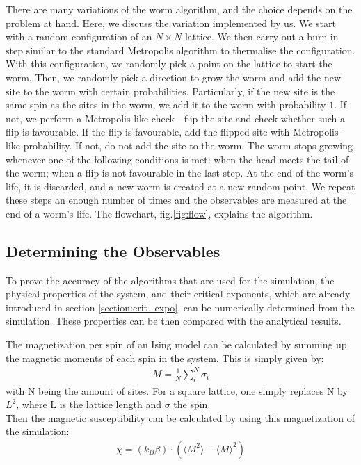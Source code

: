 \documentclass[%
reprint,
 amsmath,amssymb,
 aps,
]{revtex4-2}
\begin{document}
There are many variations of the worm algorithm, and the choice depends on the problem at hand. Here, we discuss the variation implemented by us. We start with a random configuration of an $N\times N$ lattice. We then carry out a burn-in step similar to the standard Metropolis algorithm to thermalise the configuration. With this configuration, we randomly pick a point on the lattice to start the worm. Then, we randomly pick a direction to grow the worm and add the new site to the worm with certain probabilities. Particularly, if the new site is the same spin as the sites in the worm, we add it to the worm with probability $1$. If not, we perform a Metropolis-like check—flip the site and check whether such a flip is favourable. If the flip is favourable, add the flipped site with Metropolis-like probability. If not, do not add the site to the worm. The worm stops growing whenever one of the following conditions is met: when the head meets the tail of the worm; when a flip is not favourable in the last step. At the end of the worm's life, it is discarded, and a new worm is created at a new random point. We repeat these steps an enough number of times and the observables are measured at the end of a worm's life. The flowchart, fig.\ref{fig:flow}, explains the algorithm. 

\subsection{Determining the Observables}
To prove the accuracy of the algorithms that are used for the simulation, the physical properties of the system, and their critical exponents, which are already introduced in section \ref{section:crit_expo}, can be numerically determined from the simulation. These properties can be then compared with the analytical results. 

The magnetization per spin of an Ising model can be calculated by summing up the magnetic moments of each spin in the system. This is simply given by: 
\begin{align}
    M = \frac{1}{N}\sum_{i}^{N} \sigma_{i}
\end{align}
with N being the amount of sites. For a square lattice, one simply replaces N by $L^{2}$, where L is the lattice length and $\sigma$ the spin. \\
Then the magnetic susceptibility can be calculated by using this magnetization of the simulation:
\begin{align}
    \chi = (k_B \beta) \cdot (\langle M^2 \rangle-\langle M \rangle^2)
\end{align}
\end{document}
